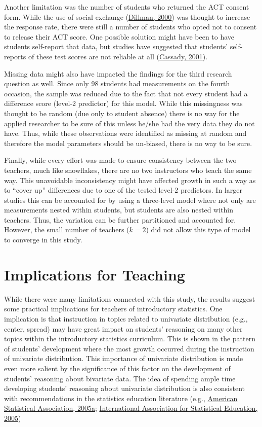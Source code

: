 \documentclass[11pt]{umnthesis}
\begin{document}
Another limitation was the number of students who returned the ACT consent form. While the use of social exchange (\protect\hyperlink{ref-dillman:2000}{Dillman, 2000}) was thought to increase the response rate, there were still a number of students who opted not to consent to release their ACT score. One possible solution might have been to have students self-report that data, but studies have suggested that students' self-reports of these test scores are not reliable at all (\protect\hyperlink{ref-cassady:2001}{Cassady, 2001}).

Missing data might also have impacted the findings for the third research question as well. Since only 98 students had measurements on the fourth occasion, the sample was reduced due to the fact that not every student had a difference score (level-2 predictor) for this model. While this missingness was thought to be random (due only to student absence) there is no way for the applied researcher to be sure of this unless he/she had the very data they do not have. Thus, while these observations were identified as missing at random and therefore the model parameters should be un-biased, there is no way to be sure.

Finally, while every effort was made to ensure consistency between the two teachers, much like snowflakes, there are no two instructors who teach the same way. This unavoidable inconsistency might have affected growth in such a way as to ``cover up'' differences due to one of the tested level-2 predictors. In larger studies this can be accounted for by using a three-level model where not only are measurements nested within students, but students are also nested within teachers. Thus, the variation can be further partitioned and accounted for. However, the small number of teachers (\(k=2\)) did not allow this type of model to converge in this study.

\hypertarget{implications-for-teaching}{%
\section{Implications for Teaching}\label{implications-for-teaching}}

While there were many limitations connected with this study, the results suggest some practical implications for teachers of introductory statistics. One implication is that instruction in topics related to univariate distribution (e.g., center, spread) may have great impact on students' reasoning on many other topics within the introductory statistics curriculum. This is shown in the pattern of students' development where the most growth occurred during the instruction of univariate distribution. This importance of univariate distribution is made even more salient by the significance of this factor on the development of students' reasoning about bivariate data. The idea of spending ample time developing students' reasoning about univariate distribution is also consistent with recommendations in the statistics education literature (e.g., \protect\hyperlink{ref-asa:2005}{American Statistical Association, 2005a}; \protect\hyperlink{ref-iase:2005}{International Association for Statistical Education, 2005})
\end{document}
